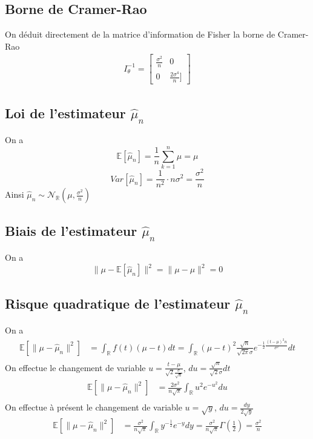 \documentclass{report}
\begin{document}
		\subsection{Borne de Cramer-Rao}
			On déduit directement de la matrice d'information de Fisher la borne de Cramer-Rao
			\begin{align*}
				I_\theta^{-1}
				=
				\left[\begin{array}{cc}
					\frac{\sigma^2}{n} & 0 \\
					0 & \frac{2\sigma^4}{n}]
				\end{array}\right]
			\end{align*}
		\subsection{Loi de l'estimateur $\hat\mu_n$}
			On a
			\[ \mathbb{E}[\hat\mu_n] = \frac{1}{n}\sum\limits_{k=1}^n \mu = \mu \]
			\[ Var[\hat\mu_n] = \frac{1}{n^2} \cdot n \sigma^2 = \frac{\sigma^2}{n} \]
			Ainsi $\hat\mu_n \sim \mathcal{N}_{\mathbb{R}}(\mu, \frac{\sigma^2}{n})$
		\subsection{Biais de l'estimateur $\hat\mu_n$}
			On a
			\[ \lVert\mu - \mathbb{E}[\hat\mu_n]\rVert^2 = \lVert \mu - \mu \rVert^2 = 0 \]
		\subsection{Risque quadratique de l'estimateur $\hat\mu_n$}
			On a
			\begin{align*}
				\mathbb{E}[ \lVert \mu - \hat\mu_n \rVert^2 ] &= \int_\mathbb{R} f(t)(\mu - t)dt = \int_\mathbb{R} (\mu - t)^2 \frac{\sqrt n}{\sqrt{2\pi}\sigma}e^{-\frac{1}{2}\frac{(t-\mu)^2 n}{\sigma^2}}dt\\
			\end{align*}
			On effectue le changement de variable $u = \frac{t-\mu}{\sqrt 2 \frac{\sigma}{\sqrt n}}$, $du = \frac{\sqrt n}{\sqrt 2 \sigma}dt$
			\begin{align*}
				\mathbb{E}[ \lVert \mu - \hat\mu_n \rVert^2 ] &= \frac{2\sigma^2}{n\sqrt \pi}\int_\mathbb{R} u^2 e^{-u^2}du \\
			\end{align*}
			On effectue à présent le changement de variable $u=\sqrt y$, $du = \frac{dy}{2 \sqrt y}$
			\begin{align*}
				\mathbb{E}[ \lVert \mu - \hat\mu_n \rVert^2 ] &= \frac{\sigma^2}{n\sqrt \pi}\int_\mathbb{R} y^{-\frac{1}{2}} e^{-y}dy = \frac{\sigma^2}{n\sqrt \pi} \Gamma(\frac{1}{2}) = \frac{\sigma^2}{n} \\
			\end{align*}
\end{document}
